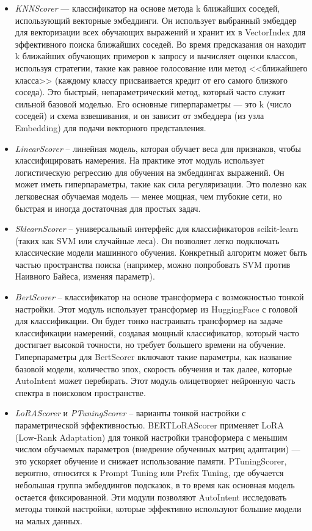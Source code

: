\documentclass[14pt,a4paper,oneside,openany]{extbook}
\begin{document}
\begin{itemize}
\item \emph{KNNScorer} — классификатор на основе метода k ближайших соседей, использующий векторные эмбеддинги. Он использует выбранный эмбеддер для векторизации всех обучающих выражений и хранит их в VectorIndex для эффективного поиска ближайших соседей. Во время предсказания он находит k ближайших обучающих примеров к запросу и вычисляет оценки классов, используя стратегии, такие как равное голосование или метод {}<<ближайшего класса>>{} (каждому классу присваивается кредит от его самого близкого соседа). Это быстрый, непараметрический метод, который часто служит сильной базовой моделью. Его основные гиперпараметры — это k (число соседей) и схема взвешивания, и он зависит от эмбеддера (из узла Embedding) для подачи векторного представления.

\item \emph{LinearScorer} -- линейная модель, которая обучает веса для признаков, чтобы классифицировать намерения. На практике этот модуль  использует логистическую регрессию для обучения на эмбеддингах выражений. Он может иметь гиперпараметры, такие как сила регуляризации. Это полезно как легковесная обучаемая модель — менее мощная, чем глубокие сети, но быстрая и иногда достаточная для простых задач.

\item \emph{SklearnScorer} -- универсальный интерфейс для классификаторов scikit-learn (таких как SVM или случайные леса). Он позволяет легко подключать классические модели машинного обучения. Конкретный алгоритм может быть частью пространства поиска (например, можно попробовать SVM против Наивного Байеса, изменяя параметр).

\item \emph{BertScorer} -- классификатор на основе трансформера с возможностью тонкой настройки. Этот модуль использует трансформер из HuggingFace с головой для классификации. Он будет тонко настраивать трансформер на задаче классификации намерений, создавая мощный классификатор, который часто достигает высокой точности, но требует большего времени на обучение. Гиперпараметры для BertScorer включают такие параметры, как название базовой модели, количество эпох, скорость обучения и так далее, которые AutoIntent может перебирать. Этот модуль олицетворяет нейронную часть спектра в поисковом пространстве.

\item \emph{LoRAScorer} и \emph{PTuningScorer} -- варианты тонкой настройки с параметрической эффективностью. BERTLoRAScorer применяет LoRA (Low-Rank Adaptation) для тонкой настройки трансформера с меньшим числом обучаемых параметров (внедрение обученных матриц адаптации) — это ускоряет обучение и снижает использование памяти. PTuningScorer, вероятно, относится к Prompt Tuning или Prefix Tuning, где обучается небольшая группа эмбеддингов подсказок, в то время как основная модель остается фиксированной. Эти модули позволяют AutoIntent исследовать методы тонкой настройки, которые эффективно используют большие модели на малых данных.


\end{itemize}
\end{document}
